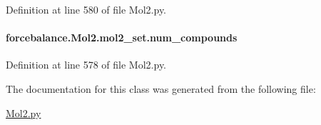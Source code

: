 Definition at line 580 of file Mol2.\-py.

\hypertarget{classforcebalance_1_1Mol2_1_1mol2__set_a28293992817a955b56a9f67163058055}{
\paragraph[{num\-\_\-compounds}]{\setlength{\rightskip}{0pt plus 5cm}forcebalance.\-Mol2.\-mol2\-\_\-set.\-num\-\_\-compounds}}\label{classforcebalance_1_1Mol2_1_1mol2__set_a28293992817a955b56a9f67163058055}


Definition at line 578 of file Mol2.\-py.



The documentation for this class was generated from the following file\-:\begin{DoxyCompactItemize}
\item 
\hyperlink{Mol2_8py}{Mol2.\-py}\end{DoxyCompactItemize}
